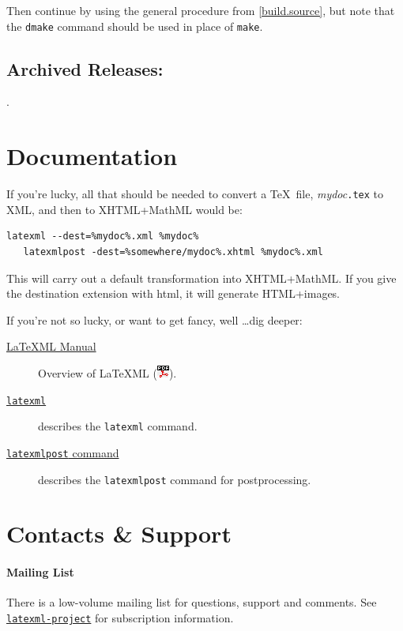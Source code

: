 \documentclass{article}
\newcommand{\PDFIcon}{\includegraphics{pdf}}
\begin{document}
Then continue by using the general procedure from \ref{build.source},
but note that the \texttt{dmake} command should be used in place of \texttt{make}.

\subsection{Archived Releases:}\label{archive}
\AllReleases.

\section{Documentation}\label{docs}
If you're lucky, all that should be needed to convert
a \TeX\ file, \textit{mydoc}\texttt{.tex} to XML, and
then to XHTML+MathML would be:
\begin{lstlisting}[style=shell]
   latexml --dest=%mydoc%.xml %mydoc%
   latexmlpost -dest=%somewhere/mydoc%.xhtml %mydoc%.xml
\end{lstlisting}
This will carry out a default transformation into XHTML+MathML.  If you
give the destination extension with html, it will generate HTML+images.

If you're not so lucky, or want to get fancy, well \ldots dig deeper:
\begin{description}
\item[\href{manual/}{LaTeXML Manual}]
    Overview of LaTeXML (\href{manual.pdf}{\PDFIcon}).
\item[\href{manual/commands/latexml.html}{\texttt{latexml}}]
    describes the \texttt{latexml} command.
\item[\href{manual/commands/latexmlpost.html}{\texttt{latexmlpost} command}]
   describes the \texttt{latexmlpost} command for postprocessing.
\end{description}


\section{Contacts \& Support}\label{contact}

\paragraph{Mailing List}
There is a low-volume mailing list for questions, support and comments.
See \href{http://lists.jacobs-university.de/mailman/listinfo/project-latexml}{\texttt{latexml-project}} for subscription information.
\end{document}

